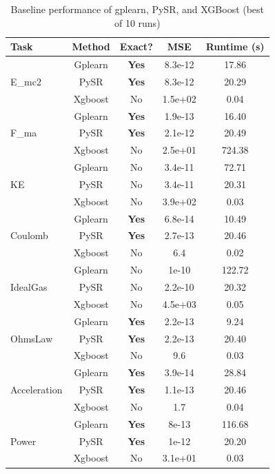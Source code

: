 \begin{table}[htbp]
\centering
\caption{Baseline performance of gplearn, PySR, and XGBoost (best of 10 runs)}
\label{tab:baselines_gp_pysr}
\begin{tabular}{lcccc}
\toprule
Task & Method & Exact? & MSE & Runtime (s) \\
\midrule
\multirow{3}{*}{E\_mc2}
& Gplearn & \textbf{Yes} & 8.3e-12 & 17.86 \\
& PySR & \textbf{Yes} & 8.3e-12 & 20.29 \\
& Xgboost & No & 1.5e+02 & 0.04 \\
\midrule
\multirow{3}{*}{F\_ma}
& Gplearn & \textbf{Yes} & 1.9e-13 & 16.40 \\
& PySR & \textbf{Yes} & 2.1e-12 & 20.49 \\
& Xgboost & No & 2.5e+01 & 724.38 \\
\midrule
\multirow{3}{*}{KE}
& Gplearn & No & 3.4e-11 & 72.71 \\
& PySR & No & 3.4e-11 & 20.31 \\
& Xgboost & No & 3.9e+02 & 0.03 \\
\midrule
\multirow{3}{*}{Coulomb}
& Gplearn & \textbf{Yes} & 6.8e-14 & 10.49 \\
& PySR & \textbf{Yes} & 2.7e-13 & 20.46 \\
& Xgboost & No & 6.4 & 0.02 \\
\midrule
\multirow{3}{*}{IdealGas}
& Gplearn & No & 1e-10 & 122.72 \\
& PySR & No & 2.2e-10 & 20.32 \\
& Xgboost & No & 4.5e+03 & 0.05 \\
\midrule
\multirow{3}{*}{OhmsLaw}
& Gplearn & \textbf{Yes} & 2.2e-13 & 9.24 \\
& PySR & \textbf{Yes} & 2.2e-13 & 20.40 \\
& Xgboost & No & 9.6 & 0.03 \\
\midrule
\multirow{3}{*}{Acceleration}
& Gplearn & \textbf{Yes} & 3.9e-14 & 28.84 \\
& PySR & \textbf{Yes} & 1.1e-13 & 20.46 \\
& Xgboost & No & 1.7 & 0.04 \\
\midrule
\multirow{3}{*}{Power}
& Gplearn & \textbf{Yes} & 8e-13 & 116.68 \\
& PySR & \textbf{Yes} & 1e-12 & 20.20 \\
& Xgboost & No & 3.1e+01 & 0.03 \\
\bottomrule
\end{tabular}
\end{table}

